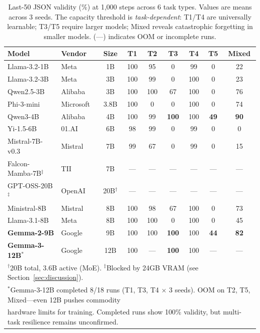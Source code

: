 \documentclass[11pt]{article}
\begin{document}
\begin{table}[t]
\centering
\caption{Last-50 JSON validity (\%) at 1{,}000 steps across 6 task types.  Values are means across 3 seeds.  The capacity threshold is \emph{task-dependent}: T1/T4 are universally learnable; T3/T5 require larger models; Mixed reveals catastrophic forgetting in smaller models. (---) indicates OOM or incomplete runs.}
\label{tab:validation}
\begin{tabular}{l l c cccccc}
\toprule
\textbf{Model} & \textbf{Vendor} & \textbf{Size} & \textbf{T1} & \textbf{T2} & \textbf{T3} & \textbf{T4} & \textbf{T5} & \textbf{Mixed} \\
\midrule
Llama-3.2-1B & Meta & 1B & 100 & 95 & 0 & 99 & 0 & 22 \\
Llama-3.2-3B & Meta & 3B & 100 & 99 & 0 & 100 & 0 & 23 \\
Qwen2.5-3B & Alibaba & 3B & 100 & 100 & 67 & 100 & 0 & 76 \\
Phi-3-mini & Microsoft & 3.8B & 100 & 0 & 0 & 100 & 0 & 74 \\
Qwen3-4B & Alibaba & 4B & 100 & 99 & \textbf{100} & 100 & \textbf{49} & \textbf{90} \\
Yi-1.5-6B & 01.AI & 6B & 98 & 99 & 0 & 99 & 0 & 0 \\
Mistral-7B-v0.3 & Mistral & 7B & 99 & 67 & 0 & 99 & 0 & 15 \\
Falcon-Mamba-7B$^\ddagger$ & TII & 7B & --- & --- & --- & --- & --- & --- \\
GPT-OSS-20B$^\ddagger$ & OpenAI & 20B$^\dagger$ & --- & --- & --- & --- & --- & --- \\
Ministral-8B & Mistral & 8B & 100 & 98 & 67 & 100 & 0 & 73 \\
Llama-3.1-8B & Meta & 8B & 100 & 100 & 0 & 100 & 0 & 45 \\
\textbf{Gemma-2-9B} & Google & 9B & 100 & 100 & \textbf{100} & 100 & \textbf{44} & \textbf{82} \\
\textbf{Gemma-3-12B}$^*$ & Google & 12B & 100 & --- & \textbf{100} & 100 & --- & --- \\
\bottomrule
\multicolumn{9}{l}{\footnotesize $^\dagger$20B total, 3.6B active (MoE).  $^\ddagger$Blocked by 24GB VRAM (see Section~\ref{sec:discussion}).}\\
\multicolumn{9}{l}{\footnotesize $^*$Gemma-3-12B completed 8/18 runs (T1, T3, T4 $\times$ 3 seeds).  OOM on T2, T5, Mixed---even 12B pushes commodity}\\
\multicolumn{9}{l}{\footnotesize hardware limits for training.  Completed runs show 100\% validity, but multi-task resilience remains unconfirmed.}
\end{tabular}
\end{table}
\end{document}

